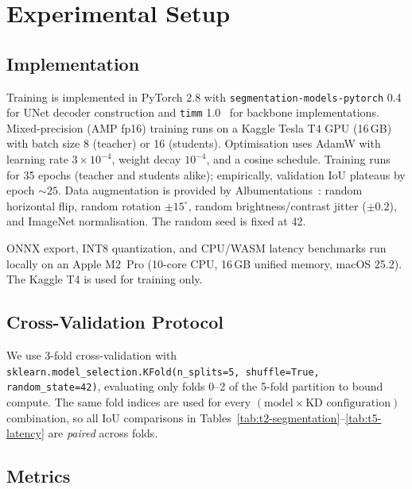 
\section{Experimental Setup}
\label{sec:experimental-setup}

\subsection{Implementation}
\label{sec:setup-impl}

Training is implemented in PyTorch 2.8 with \texttt{segmentation-models-pytorch} 0.4~\cite{iakubovskii2019smp} for UNet decoder construction and \texttt{timm} 1.0~\cite{wightman2019timm} for backbone implementations. Mixed-precision (AMP fp16) training runs on a Kaggle Tesla T4 GPU (16\,GB) with batch size 8 (teacher) or 16 (students). Optimisation uses AdamW with learning rate $3\!\times\!10^{-4}$, weight decay $10^{-4}$, and a cosine schedule. Training runs for 35 epochs (teacher and students alike); empirically, validation IoU plateaus by epoch $\sim 25$. Data augmentation is provided by Albumentations~\cite{buslaev2020albumentations}: random horizontal flip, random rotation $\pm 15^{\circ}$, random brightness/contrast jitter ($\pm 0.2$), and ImageNet normalisation. The random seed is fixed at 42.

ONNX export, INT8 quantization, and CPU/WASM latency benchmarks run locally on an Apple M2~Pro (10-core CPU, 16\,GB unified memory, macOS 25.2). The Kaggle T4 is used for training only.

\subsection{Cross-Validation Protocol}
\label{sec:setup-cv}

We use 3-fold cross-validation with \texttt{sklearn.\allowbreak{}model\_selection.\allowbreak{}KFold(n\_splits=5,\allowbreak\,shuffle=True,\allowbreak\,random\_state=42)}, evaluating only folds 0--2 of the 5-fold partition to bound compute. The same fold indices are used for every $(\text{model} \times \text{KD configuration})$ combination, so all IoU comparisons in Tables~\ref{tab:t2-segmentation}--\ref{tab:t5-latency} are \emph{paired} across folds.

\subsection{Metrics}
\label{sec:setup-metrics}

